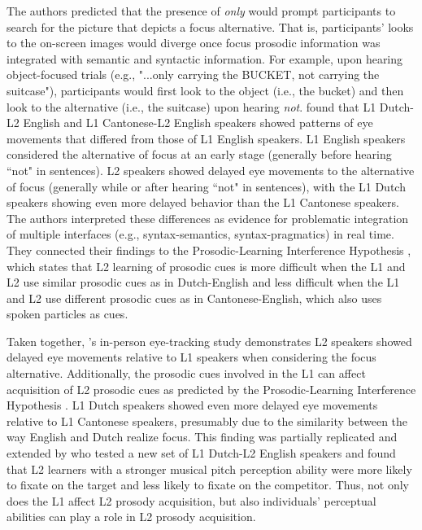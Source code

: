 The authors predicted that the presence of \textit{only} would prompt participants to search for the picture that depicts a focus alternative. That is, participants' looks to the on-screen images would diverge once focus prosodic information was integrated with semantic and syntactic information. For example, upon hearing object-focused trials (e.g., "...only carrying the BUCKET, not carrying the suitcase"), participants would first look to the object (i.e., the bucket) and then look to the alternative (i.e., the suitcase) upon hearing \textit{not}. \cite{Ge2021} found that L1 Dutch-L2 English and L1 Cantonese-L2 English speakers showed patterns of eye movements that differed from those of L1 English speakers. L1 English speakers considered the alternative of focus at an early stage (generally before hearing ``not" in sentences). L2 speakers showed delayed eye movements to the alternative of focus (generally while or after hearing ``not" in sentences), with the L1 Dutch speakers showing even more delayed behavior than the L1 Cantonese speakers. The authors interpreted these differences as evidence for problematic integration of multiple interfaces (e.g., syntax-semantics, syntax-pragmatics) in real time. They connected their findings to the Prosodic-Learning Interference Hypothesis \citep{tremblay2016effects, tremblay2021re}, which states that L2 learning of prosodic cues is more difficult when the L1 and L2 use similar prosodic cues as in Dutch-English and less difficult when the L1 and L2 use different prosodic cues as in Cantonese-English, which also uses spoken particles as cues.  

Taken together, \cite{Ge2021}'s in-person eye-tracking study demonstrates L2 speakers showed delayed eye movements relative to L1 speakers when considering the focus alternative. Additionally, the prosodic cues involved in the L1 can affect acquisition of L2 prosodic cues \citep[see also][]{ge2021comprehension} as predicted by the Prosodic-Learning Interference Hypothesis \citep{tremblay2016effects}. L1 Dutch speakers showed even more delayed eye movements relative to L1 Cantonese speakers, presumably due to the similarity between the way English and Dutch realize focus. This finding was partially replicated and extended by \cite{jansen2023influence} who tested a new set of L1 Dutch-L2 English speakers and found that L2 learners with a stronger musical pitch perception ability were more likely to fixate on the target and less likely to fixate on the competitor. Thus, not only does the L1 affect L2 prosody acquisition, but also individuals' perceptual abilities can play a role in L2 prosody acquisition.

